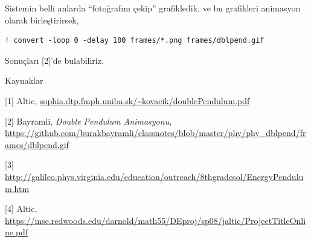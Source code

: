 \documentclass[12pt,fleqn]{article}\usepackage{../../common}
\begin{document}
Sistemin belli anlarda ``fotoğrafını çekip'' grafikledik, ve bu grafikleri
animasyon olarak birleştirirsek,

\begin{verbatim}
! convert -loop 0 -delay 100 frames/*.png frames/dblpend.gif
\end{verbatim}

Sonuçları [2]'de bulabiliriz. 

Kaynaklar

[1] Altic, \url{sophia.dtp.fmph.uniba.sk/~kovacik/doublePendulum.pdf}

[2] Bayramli, {\em Double Pendulum Animasyonu}, \url{https://github.com/burakbayramli/classnotes/blob/master/phy/phy_dblpend/frames/dblpend.gif}

[3] \url{http://galileo.phys.virginia.edu/education/outreach/8thgradesol/EnergyPendulum.htm}

[4] Altic, \url{https://mse.redwoods.edu/darnold/math55/DEproj/sp08/jaltic/ProjectTitleOnline.pdf}
\end{document}
